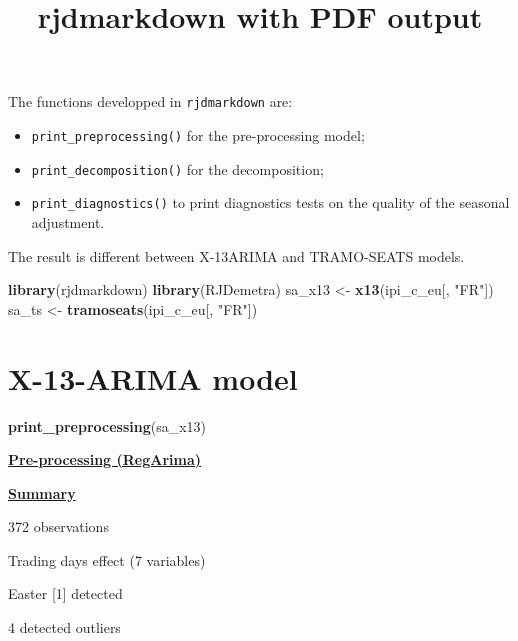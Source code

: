 \documentclass[
]{article}
\title{rjdmarkdown with PDF output}
\author{}
\date{\vspace{-2.5em}}
\newenvironment{Shaded}{\begin{snugshade}}{\end{snugshade}}
\newcommand{\FunctionTok}[1]{\textcolor[rgb]{0.13,0.29,0.53}{\textbf{#1}}}
\newcommand{\NormalTok}[1]{#1}
\newcommand{\OtherTok}[1]{\textcolor[rgb]{0.56,0.35,0.01}{#1}}
\newcommand{\StringTok}[1]{\textcolor[rgb]{0.31,0.60,0.02}{#1}}
\providecommand{\tightlist}{%
  \setlength{\itemsep}{0pt}\setlength{\parskip}{0pt}}
\begin{document}
\maketitle

The functions developped in \texttt{rjdmarkdown} are:

\begin{itemize}
\tightlist
\item
  \texttt{print\_preprocessing()} for the pre-processing model;\\
\item
  \texttt{print\_decomposition()} for the decomposition;\\
\item
  \texttt{print\_diagnostics()} to print diagnostics tests on the
  quality of the seasonal adjustment.
\end{itemize}

The result is different between X-13ARIMA and TRAMO-SEATS models.

\begin{Shaded}
\begin{Highlighting}[]
\FunctionTok{library}\NormalTok{(rjdmarkdown)}
\FunctionTok{library}\NormalTok{(RJDemetra)}
\NormalTok{sa\_x13 }\OtherTok{\textless{}{-}} \FunctionTok{x13}\NormalTok{(ipi\_c\_eu[, }\StringTok{"FR"}\NormalTok{])}
\NormalTok{sa\_ts }\OtherTok{\textless{}{-}} \FunctionTok{tramoseats}\NormalTok{(ipi\_c\_eu[, }\StringTok{"FR"}\NormalTok{])}
\end{Highlighting}
\end{Shaded}

\section{X-13-ARIMA model}\label{x-13-arima-model}

\begin{Shaded}
\begin{Highlighting}[]
\FunctionTok{print\_preprocessing}\NormalTok{(sa\_x13)}
\end{Highlighting}
\end{Shaded}

\underline{\textbf{Pre-processing (RegArima)}}

\underline{\textbf{Summary}}

372 observations

Trading days effect (7 variables)

Easter {[}1{]} detected

4 detected outliers
\end{document}
